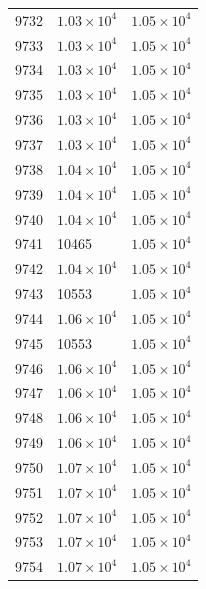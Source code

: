 \begin{table}[H]
\begin{tabular}{lll}
9732 & $\displaystyle 1.03 \times 10^{4}$ & $\displaystyle 1.05 \times 10^{4}$ \\
9733 & $\displaystyle 1.03 \times 10^{4}$ & $\displaystyle 1.05 \times 10^{4}$ \\
9734 & $\displaystyle 1.03 \times 10^{4}$ & $\displaystyle 1.05 \times 10^{4}$ \\
9735 & $\displaystyle 1.03 \times 10^{4}$ & $\displaystyle 1.05 \times 10^{4}$ \\
9736 & $\displaystyle 1.03 \times 10^{4}$ & $\displaystyle 1.05 \times 10^{4}$ \\
9737 & $\displaystyle 1.03 \times 10^{4}$ & $\displaystyle 1.05 \times 10^{4}$ \\
9738 & $\displaystyle 1.04 \times 10^{4}$ & $\displaystyle 1.05 \times 10^{4}$ \\
9739 & $\displaystyle 1.04 \times 10^{4}$ & $\displaystyle 1.05 \times 10^{4}$ \\
9740 & $\displaystyle 1.04 \times 10^{4}$ & $\displaystyle 1.05 \times 10^{4}$ \\
9741 & 10465 & $\displaystyle 1.05 \times 10^{4}$ \\
9742 & $\displaystyle 1.04 \times 10^{4}$ & $\displaystyle 1.05 \times 10^{4}$ \\
9743 & 10553 & $\displaystyle 1.05 \times 10^{4}$ \\
9744 & $\displaystyle 1.06 \times 10^{4}$ & $\displaystyle 1.05 \times 10^{4}$ \\
9745 & 10553 & $\displaystyle 1.05 \times 10^{4}$ \\
9746 & $\displaystyle 1.06 \times 10^{4}$ & $\displaystyle 1.05 \times 10^{4}$ \\
9747 & $\displaystyle 1.06 \times 10^{4}$ & $\displaystyle 1.05 \times 10^{4}$ \\
9748 & $\displaystyle 1.06 \times 10^{4}$ & $\displaystyle 1.05 \times 10^{4}$ \\
9749 & $\displaystyle 1.06 \times 10^{4}$ & $\displaystyle 1.05 \times 10^{4}$ \\
9750 & $\displaystyle 1.07 \times 10^{4}$ & $\displaystyle 1.05 \times 10^{4}$ \\
9751 & $\displaystyle 1.07 \times 10^{4}$ & $\displaystyle 1.05 \times 10^{4}$ \\
9752 & $\displaystyle 1.07 \times 10^{4}$ & $\displaystyle 1.05 \times 10^{4}$ \\
9753 & $\displaystyle 1.07 \times 10^{4}$ & $\displaystyle 1.05 \times 10^{4}$ \\
9754 & $\displaystyle 1.07 \times 10^{4}$ & $\displaystyle 1.05 \times 10^{4}$ \\

\end{tabular}
\end{table}
